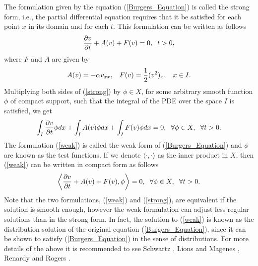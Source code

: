     The formulation given by the equation (\ref{Burgers_Equation}) is called the strong form, i.e., the partial differential equation requires that it be satisfied for each point $x$ in its domain and for each $t$. This formulation can be written as follows
    \begin{equation}
    	\frac{\partial v}{\partial t} + A(v) + F(v) = 0, \hspace{2mm} t > 0,
    	\label{strong}
    \end{equation}
	where $F$ and $A$ are given by
	\begin{equation*}
		A(v) = - \alpha v_{xx}, \hspace{3mm} F(v) = \frac{1}{2} (v^2)_x , \hspace{3mm} x \in I.
	\end{equation*} 
	Multiplying both sides of (\ref{strong}) by $\phi \in X$, for some arbitrary smooth function $\phi$ of compact support, such that the integral of the PDE over the space $I$ is satisfied, we get   
    \begin{equation}
    	\displaystyle \int_{I} \frac{\partial v}{\partial t} \phi dx + \int_{I} A(v) \phi dx + \int_{I} F(v) \phi dx = 0, \hspace{2mm} \forall \phi \in X,\hspace{2mm} \forall t > 0.
    	\label{weak}
    \end{equation}
	The formulation (\ref{weak}) is called the weak form of (\ref{Burgers_Equation}) and $\phi$ are known as the test functions.  If we denote $\langle \cdot, \cdot \rangle$ as the inner product in $X$, then (\ref{weak}) can be written in compact form as follows
    \begin{equation}
    	\left \langle \frac{\partial v}{\partial t} + A(v) + F(v), \phi\right\rangle = 0, \hspace{2mm} \forall \phi \in X, \hspace{2mm} \forall t > 0.	
    	\label{compact_weak}
    \end{equation}
	Note that the two formulations, (\ref{weak}) and (\ref{strong}), are equivalent if the solution is smooth enough, however the weak formulation can adjust less regular solutions than in the strong form. In fact, the solution to (\ref {weak}) is known as the distribution solution of the original equation (\ref{Burgers_Equation}), since it can be shown to satisfy (\ref{Burgers_Equation}) in the sense of distributions. For more details of the above it is recommended to see Schwartz \cite{Schwartz1966}, Lions and Magenes \cite{Lions1972}, Renardy and Rogers \cite{Renardy1993}. \\
	
